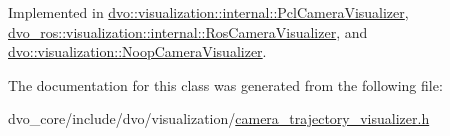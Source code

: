 Implemented in \mbox{\hyperlink{classdvo_1_1visualization_1_1internal_1_1_pcl_camera_visualizer_adfe2b8752f78ee0fa6ee193be70941eb}{dvo\+::visualization\+::internal\+::\+Pcl\+Camera\+Visualizer}}, \mbox{\hyperlink{classdvo__ros_1_1visualization_1_1internal_1_1_ros_camera_visualizer_aa347218752bde73e09874771fe3b4410}{dvo\+\_\+ros\+::visualization\+::internal\+::\+Ros\+Camera\+Visualizer}}, and \mbox{\hyperlink{classdvo_1_1visualization_1_1_noop_camera_visualizer_a7983d8de9de45c5617c3e877d36d6ff3}{dvo\+::visualization\+::\+Noop\+Camera\+Visualizer}}.



The documentation for this class was generated from the following file\+:\begin{DoxyCompactItemize}
\item 
dvo\+\_\+core/include/dvo/visualization/\mbox{\hyperlink{camera__trajectory__visualizer_8h}{camera\+\_\+trajectory\+\_\+visualizer.\+h}}\end{DoxyCompactItemize}
